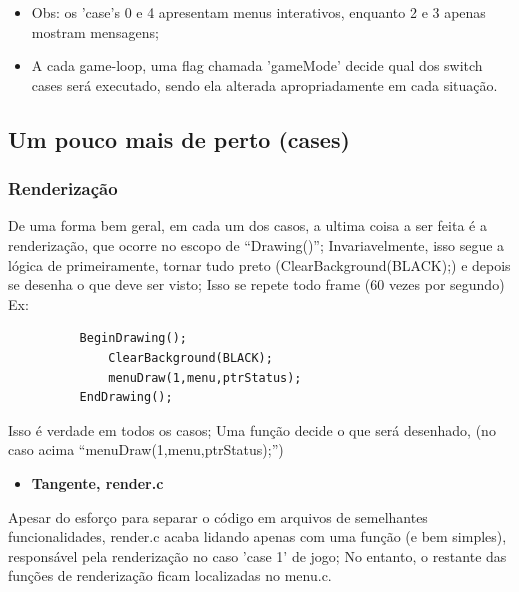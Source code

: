 \documentclass[11pt]{article}
\begin{document}
\begin{itemize}
\item Obs: os 'case's 0 e 4 apresentam menus interativos, enquanto 2 e 3 apenas mostram mensagens;
\item A cada game-loop, uma flag chamada 'gameMode' decide qual dos switch cases será executado, sendo ela alterada apropriadamente em cada situação.
\end{itemize}
\subsection{Um pouco mais de perto (cases)}
\label{sec:org4ba4671}
\subsubsection{Renderização}
\label{sec:orgf832e64}
De uma forma bem geral, em cada um dos casos, a ultima coisa a ser feita é a renderização, que ocorre no escopo de ``Drawing()'';
Invariavelmente, isso segue a lógica de primeiramente, tornar tudo preto (ClearBackground(BLACK);) e depois se desenha o que deve ser visto; Isso se repete todo frame (60 vezes por segundo)
Ex:
\begin{verbatim}
          BeginDrawing();
              ClearBackground(BLACK);
              menuDraw(1,menu,ptrStatus);
          EndDrawing();
\end{verbatim}
Isso é verdade em todos os casos; Uma função decide o que será desenhado, (no caso acima ``menuDraw(1,menu,ptrStatus);'')
\begin{itemize}
\item \textbf{Tangente, render.c}
\end{itemize}
Apesar do esforço para separar o código em arquivos de semelhantes funcionalidades, render.c acaba lidando apenas com uma função (e bem simples), responsável pela renderização no caso 'case 1' de jogo; No entanto, o restante das funções de renderização ficam localizadas no menu.c.
\end{document}
